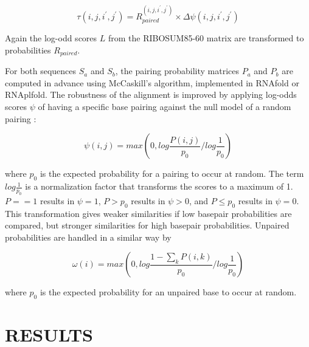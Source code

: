 \documentclass[a4paper,twoside]{article}
\begin{document}
\begin{equation}\label{eq10}
	\tau(i,j,i^\prime,j^\prime) = R_{paired}^{(i,j,i^\prime,j^\prime)}
\times \Delta \psi(i,j,i^\prime,j^\prime)
\end{equation}

Again the log-odd scores $L$ from the RIBOSUM85-60 matrix \cite{Klein14499004}
are transformed to probabilities $R_{paired}$.

For both sequences $S_a$ and $S_b$, the pairing probability matrices $P_a$ and
$P_b$ are computed in advance using McCaskill's algorithm, implemented in
RNAfold or RNAplfold. The robustness of the alignment is improved by applying
log-odds scores $\psi$ of having a specific base pairing against the null model
of a random pairing \cite{Will17432929}:

\begin{equation}\label{eq11}
	\psi(i,j) = max \left( 0, log \frac{P(i,j)}{p_0} / log \frac{1}{p_0} \right)
\end{equation}

where $p_0$ is the expected probability for a pairing to occur at random. The
term $log \frac{1}{p_0}$ is a normalization factor that transforms the scores to
a maximum of 1. $P==1$ results in $\psi=1$, $P>p_0$ results in $\psi>0$, and $P\le
p_0$ results in $\psi=0$.  This transformation gives weaker similarities if low
basepair probabilities are compared, but stronger similarities for high basepair
probabilities. Unpaired probabilities are handled in a similar way by

\begin{equation}\label{eq12}
	\omega(i) = max \left( 0, log \frac{1 - \sum_k P(i,k)}{p_0} / log \frac{1}{p_0} \right)
\end{equation}

where $p_0$ is the expected probability for an unpaired base to occur at
random.


\section{\uppercase{Results}}
\end{document}
